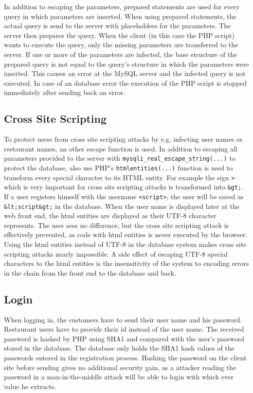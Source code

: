 In addition to escaping the parameters, prepared statements are used for every query in which parameters are inserted. When using prepared statements, the actual query is send to the server with placeholders for the parameters. The server then prepares the query. When the client (in this case the PHP script) wants to execute the query, only the missing parameters are transferred to the server. If one or more of the parameters are infected, the base structure of the prepared query is not  equal to the query's structure in which the parameters were inserted. This causes an error at the MySQL server and the infected query is not executed. In case of an database error the execution of the PHP script is stopped immediately after sending back an error.

\subsection{Cross Site Scripting}
To protect users from cross site scripting attacks by e.g. infecting user names or restaurant names, an other escape function is used. In addition to escaping all parameters provided to the server with \texttt{mysqli\_real\_escape\_string(...)} to protect the database, also use PHP's \texttt{htmlentities(...)} function is used to transform every special character to its HTML entity. For example the sign \texttt{>} which is very important for cross site scripting attacks is transformed into \texttt{\&gt;}. If a user registers himself with the username \texttt{<script>}, the user will be saved as \texttt{\&lt;script\&gt;} in the database. When the user name is displayed later at the web front end, the html entities are displayed as their UTF-8 character represents. The user sees no difference, but the cross site scripting attack is effectively prevented, as code with html entities is never executed by the browser. Using the html entities instead of UTF-8 in the database system makes cross site scripting attacks nearly impossible. A side effect of escaping UTF-8 special characters to the html entities is the insensitivity of the system to encoding errors in the chain from the front end to the database and back.

\subsection{Login}
When logging in, the customers have to send their user name and his password. Restaurant users have to provide their id instead of the user name. The received password is hashed by PHP using SHA1 and compared with the user's password stored in the database. The database only holds the SHA1 hash values of the passwords entered in the registration process. Hashing the password on the client site before sending gives no additional security gain, as a attacker reading the password in a man-in-the-middle attack will be able to login with which ever value he extracts.

